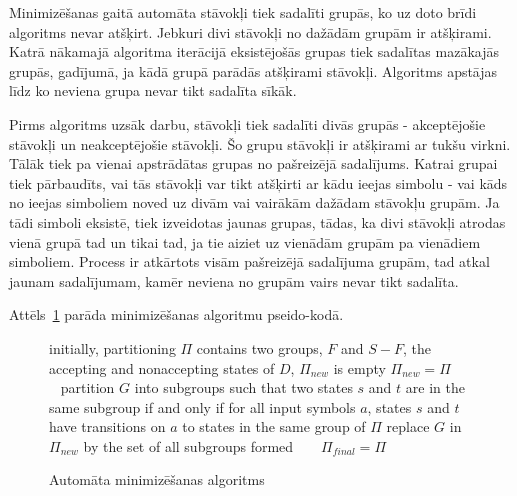 Minimizēšanas gaitā automāta stāvokļi tiek sadalīti grupās, ko uz doto brīdi algoritms nevar atšķirt. Jebkuri divi stāvokļi no dažādām grupām ir atšķirami. Katrā nākamajā algoritma iterācijā eksistējošās grupas tiek sadalītas mazākajās grupās, gadījumā, ja kādā grupā parādās atšķirami stāvokļi. Algoritms apstājas līdz ko neviena grupa nevar tikt sadalīta sīkāk.

Pirms algoritms uzsāk darbu, stāvokļi tiek sadalīti divās grupās - akceptējošie stāvokļi un neakceptējošie stāvokļi. Šo grupu stāvokļi ir atšķirami ar tukšu virkni. Tālāk tiek pa vienai apstrādātas grupas no pašreizējā sadalījums. Katrai grupai tiek pārbaudīts, vai tās stāvokļi var tikt atšķirti ar kādu ieejas simbolu - vai kāds no ieejas simboliem noved uz divām vai vairākām dažādam stāvokļu grupām. Ja tādi simboli eksistē, tiek izveidotas jaunas grupas, tādas, ka divi stāvokļi atrodas vienā grupā tad un tikai tad, ja tie aiziet uz vienādām grupām pa vienādiem simboliem. Process ir atkārtots visām pašreizējā sadalījuma grupām, tad atkal jaunam sadalījumam, kamēr neviena no grupām vairs nevar tikt sadalīta.

Attēls~\ref{fig:min_algorithm} parāda minimizēšanas algoritmu pseido-kodā.

\begin{figure}[H]
  \begin{algorithmic}
  \State initially, partitioning $\Pi$ contains two groups, $F$ and $S-F$, the accepting and nonaccepting states of $D$, $\Pi_{new}$ is empty
      \State $\Pi_{new} = \Pi$
          \State partition $G$ into subgroups such that two states $s$ and $t$ are in the same subgroup if and only if for all input symbols $a$, states $s$ and $t$ have transitions on $a$ to states in the same group of $\Pi$
          \State replace $G$ in $\Pi_{new}$ by the set of all subgroups formed
      \EndFor
  \EndWhile
  \State $\Pi_{final} = \Pi$
  \end{algorithmic}
  \caption{\label{fig:min_algorithm}Automāta minimizēšanas algoritms}
\end{figure}

